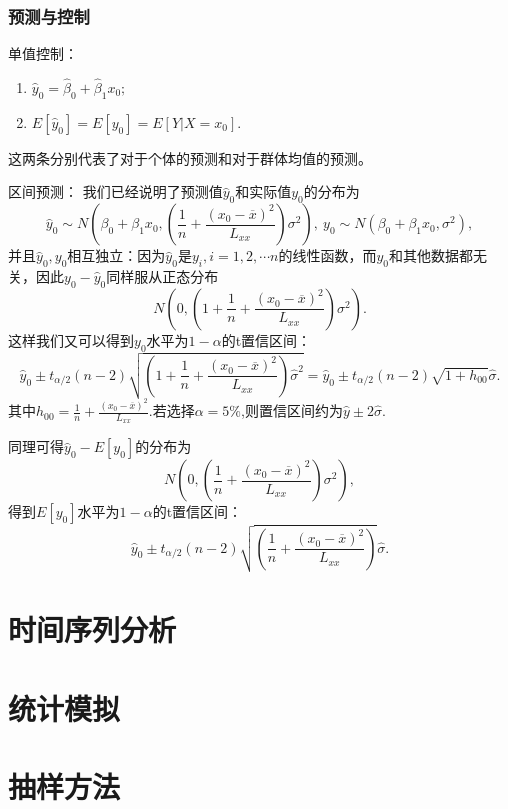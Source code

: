 \documentclass[lang=cn,10pt]{elegantbook}
\begin{document}
    \subsection{预测与控制}
    单值控制：
    \begin{enumerate}
        \item \(\hat{y}_0=\hat{\beta}_0+\hat{\beta}_1x_0;\)
        \item \(E[\hat{y}_0]=E[y_0]=E[Y|X=x_0].\)
    \end{enumerate}
    这两条分别代表了对于个体的预测和对于群体均值的预测。

    区间预测：
    我们已经说明了预测值\(\hat{y}_0\)和实际值\(y_0\)的分布为
    \[\hat{y}_0\sim N(\beta_0+\beta_1x_0,(\frac{1}{n}+\frac{(x_0-\overline{x})^2}{L_{xx}})\sigma^2),\ y_0\sim N(\beta_0+\beta_1x_0,\sigma^2),\]
    并且\(\hat{y}_0,y_0\)相互独立：因为\(\hat{y}_0\)是\(y_i,i=1,2,\cdots n\)的线性函数，而\(y_0\)和其他数据都无关，因此\(y_0-\hat{y}_0\)同样服从正态分布
    \[N(0,(1+\frac{1}{n}+\frac{(x_0-\overline{x})^2}{L_{xx}})\sigma^2).\]
    这样我们又可以得到\(y_0\)水平为\(1-\alpha\)的t置信区间：
    \[\hat{y}_0\pm t_{\alpha/2}(n-2)\sqrt{(1+\frac{1}{n}+\frac{(x_0-\overline{x})^2}{L_{xx}})\hat{\sigma}^2}=\hat{y}_0\pm t_{\alpha/2}(n-2)\sqrt{1+h_{00}}\hat{\sigma}.\]
    其中\(h_{00}=\frac{1}{n}+\frac{(x_0-\overline{x})^2}{L_{xx}}.\)若选择\(\alpha=5\%\),则置信区间约为\(\hat{y}\pm 2\hat{\sigma}\).

    同理可得\(\hat{y}_0-E[y_0]\)的分布为
    \[N(0,(\frac{1}{n}+\frac{(x_0-\overline{x})^2}{L_{xx}})\sigma^2),\]
    得到\(E[y_0]\)水平为\(1-\alpha\)的t置信区间：
    \[\hat{y}_0\pm t_{\alpha/2}(n-2)\sqrt{(\frac{1}{n}+\frac{(x_0-\overline{x})^2}{L_{xx}})}\hat{\sigma}.\]



    \chapter{时间序列分析}

    \chapter{统计模拟}

    \chapter{抽样方法}
\end{document}
